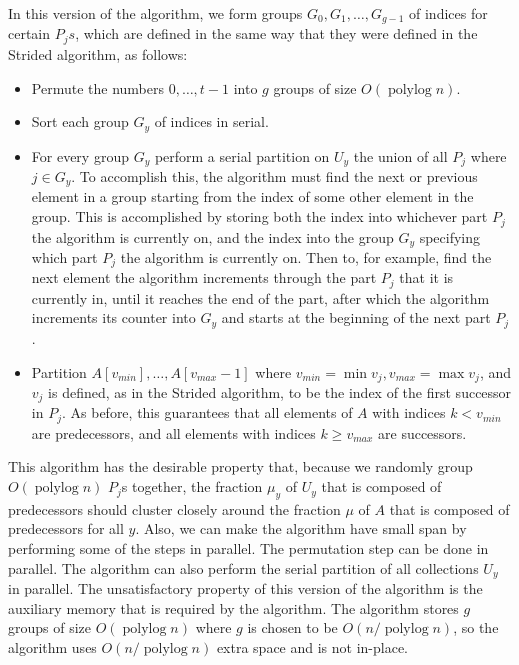 \documentclass[twocolumn, twoside, 12pt]{article}
\def\polylog{\operatorname{polylog}}
\renewcommand{\paragraph}[1]{\vspace{0.09in}\noindent{\bf \boldmath #1.}}
\begin{document}
\paragraph{Version 1}
In this version of the algorithm, we form groups $G_0,G_1,\ldots,G_{g-1}$ of indices for certain $P_js$, which are defined in the same way that they were defined in the Strided algorithm, as follows:
\begin{itemize}
	\item Permute the numbers $0,\ldots, t-1$ into $g$ groups of size $O(\polylog n)$.
	\item Sort each group $G_y$ of indices in serial. 
	\item For every group $G_y$ perform a serial partition on $U_y$ the union of all $P_j$ where $j \in G_y$. To accomplish this, the algorithm must find the next or previous element in a group starting from the index of some other element in the group. This is accomplished by storing both the index into whichever part $P_j$ the algorithm is currently on, and the index into the group $G_y$ specifying which part $P_j$ the algorithm is currently on. Then to, for example, find the next element the algorithm increments through the part $P_j$ that it is currently in, until it reaches the end of the part, after which the algorithm increments its counter into $G_y$ and starts at the beginning of the next part $P_j$.
	\item Partition $A[v_{min}], \ldots, A[v_{max}-1]$ where $v_{min}=\min{v_j}, v_{max}=\max{v_j}$, and $v_j$ is defined, as in the Strided algorithm, to be the index of the first successor in $P_j$. As before, this guarantees that all elements of $A$ with indices $k<v_{min}$ are predecessors, and all elements with indices $k\geq v_{max}$ are successors.
\end{itemize}
This algorithm has the desirable property that, because we randomly group $O(\polylog n)$ $P_j$s together, the fraction $\mu_y$ of $U_y$ that is composed of predecessors should cluster closely around the fraction $\mu$ of $A$ that is composed of predecessors for all $y$.
Also, we can make the algorithm have small span by performing some of the steps in parallel.
The permutation step can be done in parallel. 
The algorithm can also perform the serial partition of all collections $U_y$ in parallel.
The unsatisfactory property of this version of the algorithm is the auxiliary memory that is required by the algorithm.
The algorithm stores $g$ groups of size $O(\polylog n)$ where $g$ is chosen to be $O(n / \polylog n)$, so the algorithm uses $O(n / \polylog n)$ extra space and is not in-place.
\end{document}
